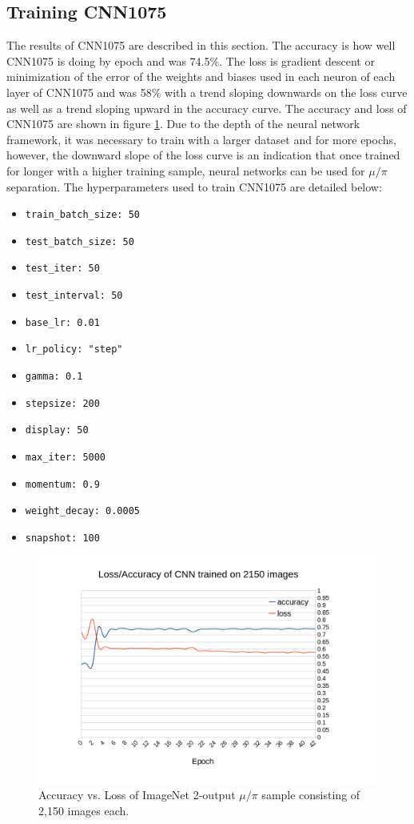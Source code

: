 \subsection{Training CNN1075}
The results of CNN1075 are described in this section. The accuracy is how well CNN1075 is doing by epoch and was 74.5\%. The loss is gradient descent or minimization of the error of the weights and biases used in each neuron of each layer of CNN1075 and was 58\% with a trend sloping downwards on the loss curve as well as a trend sloping upward in the accuracy curve. The accuracy and loss of CNN1075 are shown in figure \ref{fig:loss_accuracy_1075}. Due to the depth of the neural network framework, it was necessary to train with a larger dataset and for more epochs, however, the downward slope of the loss curve is an indication that once trained for longer with a higher training sample, neural networks can be used for $\mu/\pi$ separation. The hyperparameters used to train CNN1075 are detailed below: 
\begin{itemize}
 \item \verb|train_batch_size: 50|
 \item \verb|test_batch_size: 50|
 \item \verb|test_iter: 50|
 \item \verb|test_interval: 50|
 \item \verb|base_lr: 0.01|
 \item \verb|lr_policy: "step"|
 \item \verb|gamma: 0.1|
 \item \verb|stepsize: 200|
 \item \verb|display: 50|
 \item \verb|max_iter: 5000|
 \item \verb|momentum: 0.9|
 \item \verb|weight_decay: 0.0005|
 \item \verb|snapshot: 100|
\end{itemize}

\begin{figure}[htp!]
\centering
\includegraphics[scale=.6]{figs/acc_loss_CNN1075.png}
\caption{Accuracy vs. Loss of ImageNet 2-output $\mu/\pi$ sample consisting of 2,150 images each.} 
\label{fig:loss_accuracy_1075}
\end{figure}

